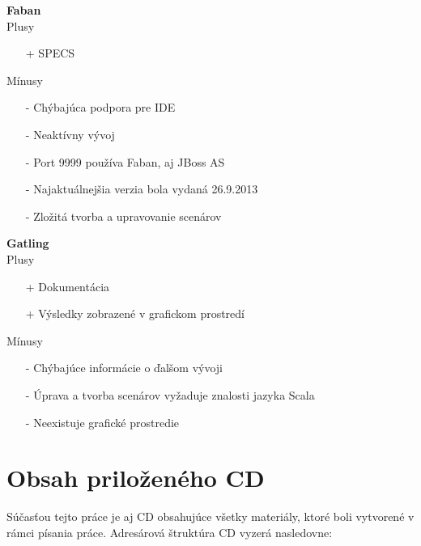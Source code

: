 \documentclass[12pt,oneside,final]{fithesis-utf8}
\begin{document}
\noindent \textbf{Faban}
\newline \\
Plusy
\begin{itemize}
\item[+] SPECS
\end{itemize}

\noindent Mínusy
\begin{itemize}
\item[-] Chýbajúca podpora pre IDE
\item[-] Neaktívny vývoj
\item[-] Port 9999 používa Faban, aj JBoss AS
\item[-] Najaktuálnejšia verzia bola vydaná 26.9.2013 
\item[-] Zložitá tvorba a upravovanie scenárov \\
\end{itemize}


\noindent \textbf{Gatling}
\newline \\
Plusy
\begin{itemize}
\item[+] Dokumentácia
\item[+] Výsledky zobrazené v grafickom prostredí
\end{itemize}

\noindent Mínusy
\begin{itemize}
\item[-] Chýbajúce informácie o ďalšom vývoji
\item[-] Úprava a tvorba scenárov vyžaduje znalosti jazyka Scala
\item[-] Neexistuje grafické prostredie \\
\end{itemize}




\appendix
\chapter{Obsah priloženého CD}
Súčasťou tejto práce je aj CD obsahujúce všetky materiály, ktoré boli vytvorené v rámci písania práce. Adresárová štruktúra CD vyzerá nasledovne:

\bigskip
\end{document}

